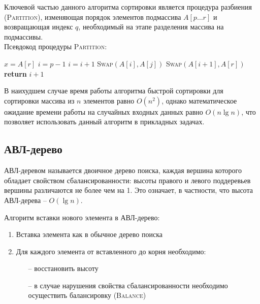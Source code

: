 \newpage

Ключевой частью данного алгоритма сортировки является процедура разбиения (\textsc{Partition}), изменяющая порядок элементов подмассива $A[p \dots r]$ и возвращающая индекс $q$, необходимый на этапе разделения массива на подмассивы.\\

\noindent Псевдокод процедуры \textsc{Partition}:
\begin{algorithmic}[1]
		\State $x=A[r]$
		\State $i=p-1$
				\State $i = i + 1$
				\State \textsc{Swap}$(A[i], A[j])$
			\EndIf
		\EndFor
		\State \textsc{Swap}$(A[i + 1], A[r])$
		\State \textbf{return} $i + 1$
	\EndProcedure
\end{algorithmic}

В наихудшем случае время работы алгоритма быстрой сортировки для сортировки массива из $n$ элементов равно $O(n^2)$, однако математическое ожидание времени работы на случайных входных данных равно $O(n\lg n)$, что позволяет использовать данный алгоритм в прикладных задачах.

\newpage

\subsection{АВЛ-дерево}
АВЛ-деревом называется двоичное дерево поиска, каждая вершина которого обладает свойством сбалансированности: высоты правого и левого поддеревьев вершины различаются не более чем на 1. Это означает, в частности, что высота АВЛ-дерева -- $O(\lg n)$\footnotemark{}.\\


\noindent Алгоритм вставки нового элемента в АВЛ-дерево:
\begin{enumerate}
\item{Вставка элемента как в обычное дерево поиска}
\item{Для каждого элемента от вставленного до корня необходимо:
	\begin{itemize}
		\item[--]{восстановить высоту}
		\item[--]{в случае нарушения свойства сбалансированности необходимо осуществить балансировку (\textsc{Balance})}
	\end{itemize}}
\end{enumerate}
	
